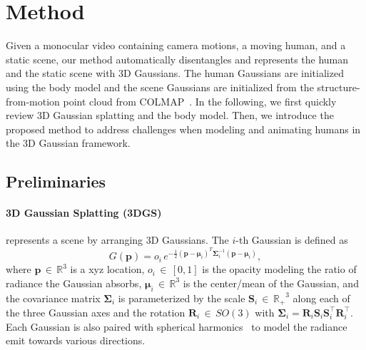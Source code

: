 \section{Method}


Given a monocular video containing camera motions, a moving human, and a static scene, our method automatically disentangles and represents the human and the static scene with 3D Gaussians.
%
The human Gaussians are initialized using the \smpl body model and the scene Gaussians are initialized from the structure-from-motion point cloud from COLMAP~\cite{colmapschoenberger2016mvs, colmapschoenberger2016sfm}.
%
In the following, we first quickly review 3D Gaussian splatting and the \smpl body model. Then, we introduce the proposed method to address challenges when modeling and animating humans in the 3D Gaussian framework.  

\subsection{Preliminaries}

\paragraph{3D Gaussian Splatting (3DGS)~\cite{kerbl3Dgaussians}}
%
represents a scene by arranging 3D Gaussians. 
%
The $i$-th Gaussian is defined as 
%
\begin{equation}
    G(\mathbf{p}) = o_i \, e^{-\frac{1}{2} (\mathbf{p} - \bm\mu_i)^T \bm\Sigma_{i}^{-1} (\mathbf{p} - \bm\mu_i)},
    \label{eq:gauss3d}
\end{equation}
%
where $\mathbf{p} \, {\in} \, \mathbb{R}^3$ is a xyz location, $o_i \, {\in} \, [0, 1]$ is the opacity modeling the ratio of radiance the Gaussian absorbs, $\bm\mu_i \, {\in} \, \mathbb{R}^3$ is the center/mean of the Gaussian, and the covariance matrix $\bm\Sigma_{i}$ is parameterized by the scale $\mathbf{S}_{i} \, {\in} \, \mathbb{R_+}^3$ along each of the three Gaussian axes and the rotation $\mathbf{R}_{i} \, {\in} \, SO(3)$ with $\bm\Sigma_{i} = \mathbf{R}_{i} \mathbf{S}_{i} \mathbf{S}_{i}^\top \mathbf{R}_{i}^\top$.
%
Each Gaussian is also paired with spherical harmonics~\cite{ramamoorthi2001efficient} to model the radiance emit towards various directions. 
% 
%
%
%
%

